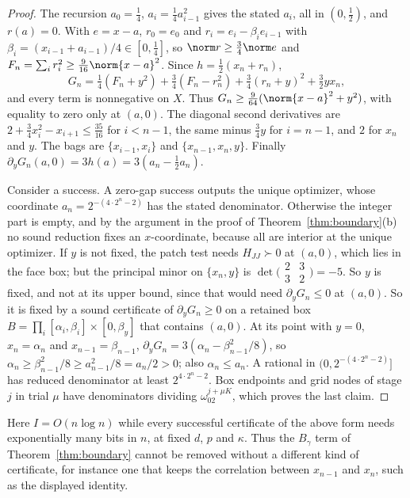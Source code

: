 \begin{proof}
The recursion $a_0=\frac14$, $a_i=\frac14a_{i-1}^2$ gives the stated $a_i$,
all in $(0,\frac12)$, and $r(a)=0$. With $e=x-a$, $r_0=e_0$ and
$r_i=e_i-\beta_ie_{i-1}$ with $\beta_i=(x_{i-1}+a_{i-1})/4\in[0,\frac14]$, so
$\norm r\ge\frac34\norm e$ and $F_n=\sum_ir_i^2\ge\frac9{16}\norm{x-a}^2$.
Since $h=\frac12(x_n+r_n)$,
\[
G_n=\tfrac14(F_n+y^2)+\tfrac34(F_n-r_n^2)+\tfrac34(r_n+y)^2+\tfrac32yx_n ,
\]
and every term is nonnegative on $X$. Thus
$G_n\ge\frac9{64}(\norm{x-a}^2+y^2)$, with equality to zero only at $(a,0)$.
The diagonal second derivatives are $2+\frac34x_i^2-x_{i+1}\le\frac{35}{16}$
for $i<n-1$, the same minus $\frac34y$ for $i=n-1$, and $2$ for $x_n$ and
$y$. The bags are $\{x_{i-1},x_i\}$ and $\{x_{n-1},x_n,y\}$. Finally
$\partial_yG_n(a,0)=3h(a)=3(a_n-\frac12a_n)$.

Consider a success. A zero-gap success outputs the unique optimizer, whose
coordinate $a_n=2^{-(4\cdot2^n-2)}$ has the stated denominator. Otherwise
the integer part is empty, and by the argument in the proof of
Theorem~\ref{thm:boundary}(b) no sound reduction fixes an $x$-coordinate,
because all are interior at the unique optimizer. If $y$ is not fixed, the
patch test needs $H_{JJ}\succ0$ at $(a,0)$, which lies in the face box; but
the principal minor on $\{x_n,y\}$ is
$\det\bigl(\begin{smallmatrix}2&3\\3&2\end{smallmatrix}\bigr)=-5$. So $y$ is
fixed, and not at its upper bound, since that would need
$\partial_yG_n\le0$ at $(a,0)$. So it is fixed by a sound certificate of
$\partial_yG_n\ge0$ on a retained box
$B=\prod_i[\alpha_i,\beta_i]\times[0,\beta_y]$ that contains $(a,0)$. At its
point with $y=0$, $x_n=\alpha_n$ and $x_{n-1}=\beta_{n-1}$,
$\partial_yG_n=3(\alpha_n-\beta_{n-1}^2/8)$, so
$\alpha_n\ge\beta_{n-1}^2/8\ge a_{n-1}^2/8=a_n/2>0$; also $\alpha_n\le a_n$.
A rational in $(0,2^{-(4\cdot2^n-2)}]$ has reduced denominator at least
$2^{4\cdot2^n-2}$. Box endpoints and grid nodes of stage $j$ in trial $\mu$
have denominators dividing $\omega_02^{j+\mu K}$, which proves the last claim.
\end{proof}

Here $I=O(n\log n)$ while every successful certificate of the above form
needs exponentially many bits in $n$, at fixed $d$, $p$ and $\kappa$. Thus
the $B_\gamma$ term of Theorem~\ref{thm:boundary} cannot be removed without
a different kind of certificate, for instance one that keeps the correlation
between $x_{n-1}$ and $x_n$, such as the displayed identity.

